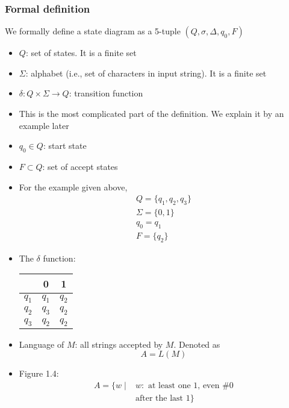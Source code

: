 \begin{frame}[allowframebreaks] \frametitle{Formal definition}
We formally define a state diagram as a 5-tuple $(Q,\sigma, \Delta, q_0, F)$
  \begin{itemize}

\item $Q$: set of states. It is a \alert{finite} set
\item $\Sigma$: alphabet (i.e., set of characters in input string). It is a finite set
\item $\delta: Q \times \Sigma \rightarrow Q$: transition function
\item [] This is the most complicated part of the definition. We explain it by an example
  later
\item $q_0 \in Q$: start state
\item $F \subset Q$: set of accept states

\item For the example given above,
\begin{gather*}
  Q=\{q_1,q_2, q_3\}\\
\Sigma=\{0,1\}\\
q_0 = q_1 \\
F=\{q_2\}
\end{gather*}
\item The $\delta$ function:
  \begin{center}
  \begin{tabular}{c|cc}
& 0 & 1\\ \hline
$q_1$ & $q_1$ & $q_2$\\
$q_2$ & $q_3$ & $q_2$\\
$q_3$ & $q_2$ & $q_2$
  \end{tabular}
\end{center}
\item Language of $M$: all strings accepted by $M$. 
Denoted as
\begin{equation*}
A=L(M)
\end{equation*}
\item Figure 1.4:
  \begin{equation*}
    \begin{split}
    A=\{
w \mid & w: \text{ at least one 1, even \# 0} \\
& \text{after the last 1}\}
\end{split}
  \end{equation*}
\end{itemize}
\end{frame}

